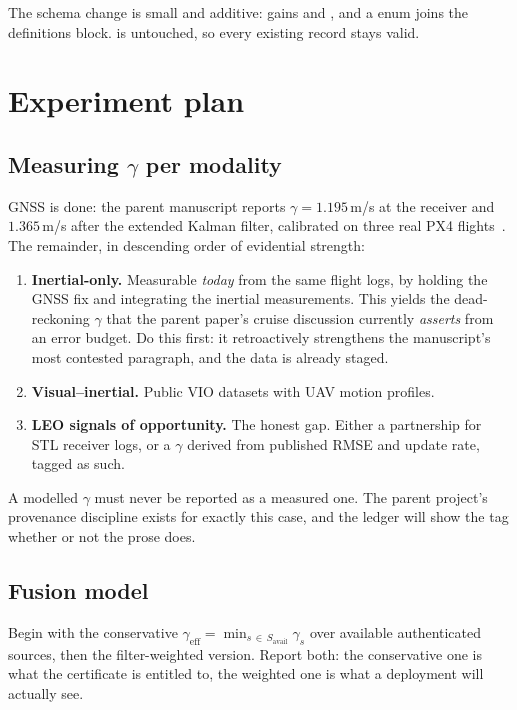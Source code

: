 \documentclass[11pt,a4paper]{article}
\begin{document}
\medskip
The schema change is small and additive:  gains
 and , and a  enum
joins the definitions block.  is untouched, so every
existing record stays valid.

\section{Experiment plan}
\subsection{Measuring $\gamma$ per modality}
GNSS is done: the parent manuscript reports $\gamma = 1.195$\,m/s at the
receiver and $1.365$\,m/s after the extended Kalman filter, calibrated on three
real PX4 flights~\cite{whelan2020uav,kong2024px4ekf}. The remainder, in
descending order of evidential strength:

\begin{enumerate}
\item \textbf{Inertial-only.} Measurable \emph{today} from the same flight logs,
by holding the GNSS fix and integrating the inertial measurements. This yields
the dead-reckoning $\gamma$ that the parent paper's cruise discussion currently
\emph{asserts} from an error budget. Do this first: it retroactively strengthens
the manuscript's most contested paragraph, and the data is already staged.
\item \textbf{Visual--inertial.} Public VIO datasets with UAV motion profiles.
\item \textbf{LEO signals of opportunity.} The honest gap. Either a partnership
for STL receiver logs, or a  $\gamma$ derived from
published RMSE and update rate, tagged as such.
\end{enumerate}

\begin{honestly}
A modelled $\gamma$ must never be reported as a measured one. The parent
project's provenance discipline exists for exactly this case, and the ledger
will show the tag whether or not the prose does.
\end{honestly}

\subsection{Fusion model}
Begin with the conservative
$\gamma_{\mathrm{eff}} = \min_{s\,\in\,S_{\mathrm{avail}}} \gamma_s$ over
available authenticated sources, then the filter-weighted version. Report both:
the conservative one is what the certificate is entitled to, the weighted one is
what a deployment will actually see.
\end{document}
